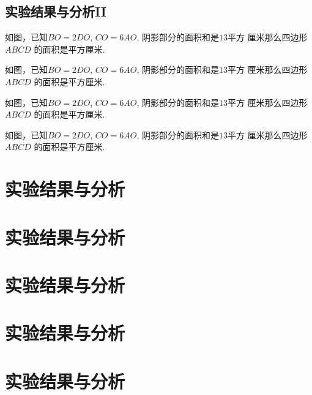 \documentclass{USTBBook}
\begin{document}
\section{实验结果与分析II}

\begin{question}
  如图，已知$BO=2DO$, $CO=6AO$, 阴影部分的面积和是$13$平方
  厘米那么四边形 $ABCD$ 的面积是\fillin[]平方厘米.
\end{question}

\begin{question}
  如图，已知$BO=2DO$, $CO=6AO$, 阴影部分的面积和是$13$平方
  厘米那么四边形 $ABCD$ 的面积是\fillin[]平方厘米.
\end{question}

\begin{question}
  如图，已知$BO=2DO$, $CO=6AO$, 阴影部分的面积和是$13$平方
  厘米那么四边形 $ABCD$ 的面积是\fillin[]平方厘米.
\end{question}

\begin{question}
  如图，已知$BO=2DO$, $CO=6AO$, 阴影部分的面积和是$13$平方
  厘米那么四边形 $ABCD$ 的面积是\fillin[]平方厘米.
\end{question}

\chapter{实验结果与分析}
\zhlipsum[14]

\chapter{实验结果与分析}
\zhlipsum[14]

\chapter{实验结果与分析}
\zhlipsum[14]

\chapter{实验结果与分析}
\zhlipsum[14]

\chapter{实验结果与分析}
\zhlipsum[14]

\backmatter
\makeBackCover
\end{document}
